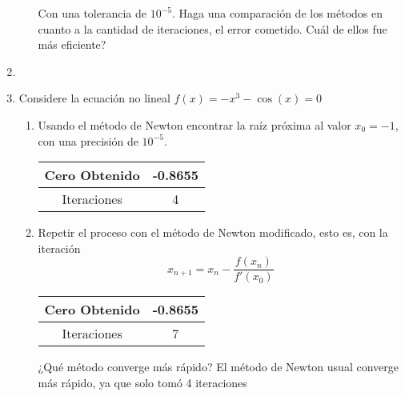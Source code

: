 \documentclass{udparticle}
\begin{document}
\begin{enumerate}
\begin{enumerate}
Con una tolerancia de $10^{-5}$. Haga una comparación de los métodos en cuanto a la cantidad de iteraciones, el error cometido. Cuál de ellos fue más eficiente?

\end{enumerate}

\item %

\item Considere la ecuación no lineal $f(x) = -x^{3} - \cos(x) = 0$
    \begin{enumerate}
    
        \item Usando el método de Newton encontrar la raíz próxima al valor $x_{0}=-1$, con una precisión de $10^{-5}$.\\
        \begin{table}[H]
        \centering
        \begin{tabular} { |c|c|}
        
        \hline
        Cero Obtenido &  -0.8655\\
        \hline
        Iteraciones   &    4\\
        \hline
        
        \end{tabular}
        \end{table}
        
        \item Repetir el proceso con el método de Newton modificado, esto es, con la iteración $$x_{n+1} = x_{n} - \frac {f(x_{n})} {f'(x_{0})} $$
        \begin{table}[H]
        \centering
        \begin{tabular} { |c|c|}
        
        \hline
        Cero Obtenido &  -0.8655\\
        \hline
        Iteraciones   &    7\\
        \hline
        
        \end{tabular}
        \end{table}
        ¿Qué método converge más rápido?
        El método de Newton usual converge más rápido, ya que solo tomó 4 iteraciones %
    \end{enumerate}


\end{enumerate}
\end{document}
